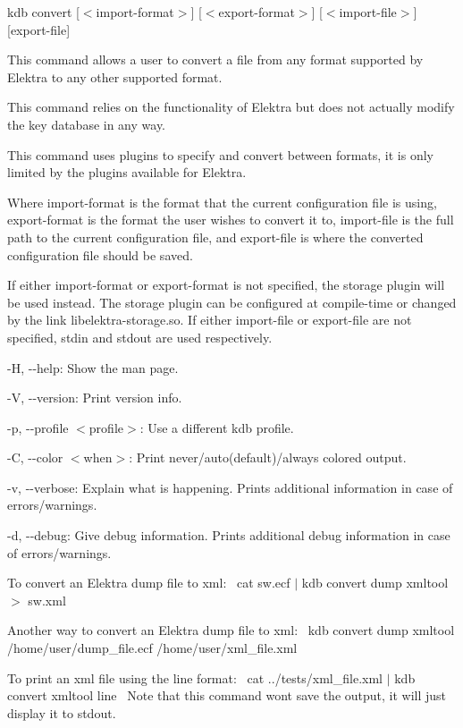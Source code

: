 {\ttfamily kdb convert \mbox{[}$<$import-\/format$>$\mbox{]} \mbox{[}$<$export-\/format$>$\mbox{]} \mbox{[}$<$import-\/file$>$\mbox{]} \mbox{[}export-\/file\mbox{]}}

This command allows a user to convert a file from any format supported by Elektra to any other supported format.

This command relies on the functionality of Elektra but does not actually modify the key database in any way.

This command uses plugins to specify and convert between formats, it is only limited by the plugins available for Elektra.

Where {\ttfamily import-\/format} is the format that the current configuration file is using, {\ttfamily export-\/format} is the format the user wishes to convert it to, {\ttfamily import-\/file} is the full path to the current configuration file, and {\ttfamily export-\/file} is where the converted configuration file should be saved.

If either {\ttfamily import-\/format} or {\ttfamily export-\/format} is not specified, the {\ttfamily storage} plugin will be used instead. The {\ttfamily storage} plugin can be configured at compile-\/time or changed by the link {\ttfamily libelektra-\/storage.\+so}. If either {\ttfamily import-\/file} or {\ttfamily export-\/file} are not specified, {\ttfamily stdin} and {\ttfamily stdout} are used respectively.


\begin{DoxyItemize}
\item {\ttfamily -\/H}, {\ttfamily -\/-\/help}\+: Show the man page.
\item {\ttfamily -\/V}, {\ttfamily -\/-\/version}\+: Print version info.
\item {\ttfamily -\/p}, {\ttfamily -\/-\/profile $<$profile$>$}\+: Use a different kdb profile.
\item {\ttfamily -\/C}, {\ttfamily -\/-\/color $<$when$>$}\+: Print never/auto(default)/always colored output.
\item {\ttfamily -\/v}, {\ttfamily -\/-\/verbose}\+: Explain what is happening. Prints additional information in case of errors/warnings.
\item {\ttfamily -\/d}, {\ttfamily -\/-\/debug}\+: Give debug information. Prints additional debug information in case of errors/warnings.
\end{DoxyItemize}

To convert an Elektra dump file to xml\+:~\newline
 {\ttfamily cat sw.\+ecf $\vert$ kdb convert dump xmltool $>$ sw.\+xml}

Another way to convert an Elektra dump file to xml\+:~\newline
 {\ttfamily kdb convert dump xmltool /home/user/dump\+\_\+file.ecf /home/user/xml\+\_\+file.xml}

To print an xml file using the {\ttfamily line} format\+:~\newline
 {\ttfamily cat ../tests/xml\+\_\+file.xml $\vert$ kdb convert xmltool line}~\newline
 Note that this command won\textquotesingle{}t save the output, it will just display it to {\ttfamily stdout}. 